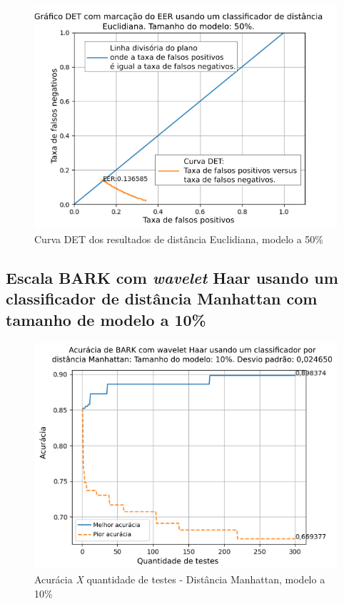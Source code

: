 \begin{figure}[!h]
	\centering
	\includegraphics[width=.9\linewidth]{images/results/det/DET_for_classifier_Euclidian_50}
	\caption{Curva DET dos resultados de distância Euclidiana, modelo a 50\%}
	\label{fig:detforclassifiereuclidian50}
\end{figure}

\subsection{Escala BARK com \textit{wavelet} Haar usando um classificador de distância Manhattan com tamanho de modelo a 10\%}



\begin{figure}[ht]
	\centering
	\includegraphics[width=\linewidth]{images/results/confusionMatrices/classifier_Manhattan_10.png}
	\caption{Acurácia \textit{X} quantidade de testes - Distância Manhattan, modelo a 10\%}
	\label{fig:classifiermanhattan10}
\end{figure}

